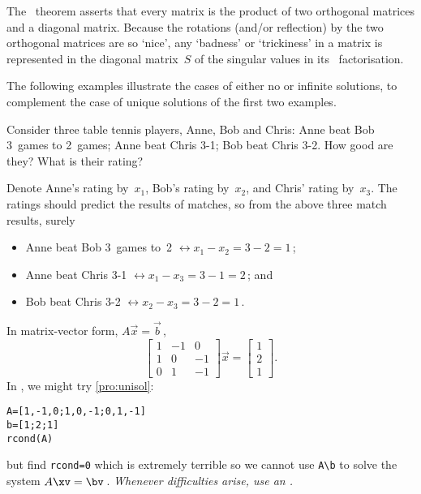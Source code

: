 The \svd\ theorem asserts that every matrix is the product of two orthogonal matrices and a diagonal matrix.  
Because the rotations (and/or reflection) by the two orthogonal matrices are so `nice', any `badness' or `trickiness' in a matrix is represented in the diagonal matrix~\(S\) of the singular values in its \svd\ factorisation.


\begin{aside}
The following examples illustrate the cases of either no or infinite solutions, to complement the case of unique solutions of the first two examples.
\end{aside}


\begin{example} \label{eg:rstp}
    Consider three table tennis players, Anne, Bob and Chris:
        Anne beat Bob 3~games to 2~games;
        Anne beat Chris 3-1;
        Bob beat Chris 3-2.
	How good are they?  What is their rating?  
    
\begin{solution} 
    Denote Anne's rating by~$x_1$, Bob's rating by~$x_2$, and Chris' 
    rating by~$x_3$.    
	The ratings should predict the results of matches, so from the
	above three match results, surely
	\begin{itemize}
\item Anne beat Bob 3~games to~2 \(\leftrightarrow x_1-x_2=3-2=1\)\,;
\item Anne beat Chris 3-1 \(\leftrightarrow x_1-x_3=3-1=2\)\,; and
\item Bob beat Chris 3-2 \(\leftrightarrow x_2-x_3=3-2=1\)\,.
\end{itemize}
    In matrix-vector form, $A\vec x=\vec b$\,,
    \begin{displaymath}
        \begin{bmatrix}
            1&-1&0\\ 1&0&-1\\ 0&1&-1
        \end{bmatrix}\vec x=
        \begin{bmatrix}
            1\\ 2\\ 1
        \end{bmatrix}.
    \end{displaymath}
\setbox\ajrqrbox\hbox{}%
\marginpar{\usebox{\ajrqrbox\\[2ex]}}%
In \script,  we might try \autoref{pro:unisol}:
\begin{verbatim}
A=[1,-1,0;1,0,-1;0,1,-1]
b=[1;2;1]
rcond(A)
\end{verbatim}
but find \verb|rcond=0| which is extremely terrible so we cannot use \verb|A\b| to solve the system \(A\xv=\bv\)\,.
\emph{Whenever difficulties arise, use an \svd.}


\end{solution}
\end{example}

